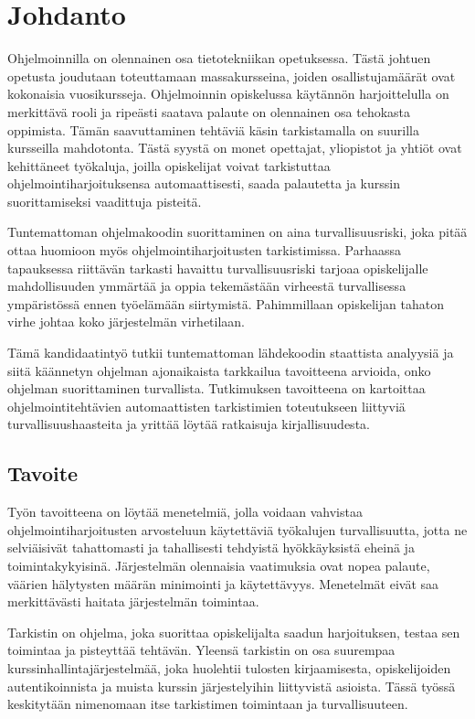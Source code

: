 

\section{Johdanto}
\label{sec:johd}

Ohjelmoinnilla on olennainen osa tietotekniikan opetuksessa. Tästä johtuen
opetusta joudutaan toteuttamaan massakursseina, joiden osallistujamäärät
ovat kokonaisia vuosikursseja. Ohjelmoinnin opiskelussa käytännön
harjoittelulla on merkittävä rooli ja ripeästi saatava palaute on olennainen
osa tehokasta oppimista. Tämän saavuttaminen tehtäviä käsin tarkistamalla on
suurilla kursseilla mahdotonta. Tästä syystä on monet opettajat, yliopistot
ja yhtiöt ovat kehittäneet työkaluja, joilla opiskelijat voivat tarkistuttaa
ohjelmointiharjoituksensa automaattisesti, saada palautetta ja kurssin
suorittamiseksi vaadittuja pisteitä.

Tuntemattoman ohjelmakoodin suorittaminen on aina turvallisuusriski, joka
pitää ottaa huomioon myös ohjelmointiharjoitusten tarkistimissa. Parhaassa
tapauksessa riittävän tarkasti havaittu turvallisuusriski tarjoaa
opiskelijalle mahdollisuuden ymmärtää ja oppia tekemästään virheestä
turvallisessa ympäristössä ennen työelämään siirtymistä. Pahimmillaan
opiskelijan tahaton virhe johtaa koko järjestelmän virhetilaan.

Tämä kandidaatintyö tutkii tuntemattoman lähdekoodin staattista
analyysiä ja siitä käännetyn ohjelman ajonaikaista tarkkailua tavoitteena
arvioida, onko ohjelman suorittaminen turvallista. Tutkimuksen tavoitteena on
kartoittaa ohjelmointitehtävien automaattisten tarkistimien toteutukseen
liittyviä turvallisuushaasteita ja yrittää löytää ratkaisuja kirjallisuudesta.

\subsection{Tavoite}

Työn tavoitteena on löytää menetelmiä, jolla voidaan vahvistaa
ohjelmointiharjoitusten arvosteluun käytettäviä työkalujen turvallisuutta,
jotta ne selviäisivät tahattomasti ja tahallisesti tehdyistä hyökkäyksistä
eheinä ja toimintakykyisinä. Järjestelmän olennaisia vaatimuksia ovat nopea
palaute, väärien hälytysten määrän minimointi ja käytettävyys.
Menetelmät eivät saa merkittävästi haitata järjestelmän toimintaa.

Tarkistin on ohjelma, joka suorittaa opiskelijalta saadun harjoituksen,
testaa sen toimintaa ja pisteyttää tehtävän. Yleensä tarkistin on osa suurempaa
kurssinhallintajärjestelmää, joka huolehtii tulosten kirjaamisesta,
opiskelijoiden autentikoinnista ja muista kurssin järjestelyihin liittyvistä
asioista. Tässä työssä keskitytään nimenomaan itse tarkistimen toimintaan ja
turvallisuuteen.

